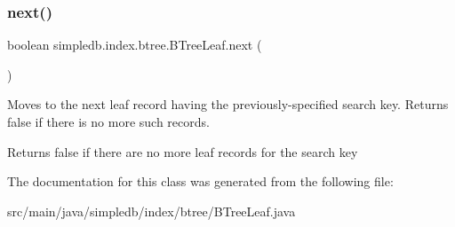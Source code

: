 \subsubsection{\texorpdfstring{next()}{next()}}
{\footnotesize\ttfamily boolean simpledb.\+index.\+btree.\+B\+Tree\+Leaf.\+next (\begin{DoxyParamCaption}{ }\end{DoxyParamCaption})\hspace{0.3cm}{\ttfamily [inline]}}

Moves to the next leaf record having the previously-\/specified search key. Returns false if there is no more such records. \begin{DoxyReturn}{Returns}
false if there are no more leaf records for the search key 
\end{DoxyReturn}


The documentation for this class was generated from the following file\+:\begin{DoxyCompactItemize}
\item 
src/main/java/simpledb/index/btree/B\+Tree\+Leaf.\+java\end{DoxyCompactItemize}
